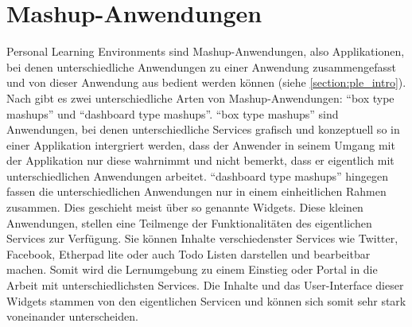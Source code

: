 \section{Mashup-Anwendungen}\label{section:mashup_anwendungen}
Personal Learning Environments sind Mashup-Anwendungen, also Applikationen, bei denen unterschiedliche Anwendungen zu einer Anwendung zusammengefasst und von dieser Anwendung aus bedient werden können (siehe \ref{section:ple_intro}). Nach \cite{Soylu2011} gibt es zwei unterschiedliche Arten von Mashup-Anwendungen: "`box type mashups"' und "`dashboard type mashups"'. "`box type mashups"' sind Anwendungen, bei denen unterschiedliche Services grafisch und konzeptuell so in einer Applikation intergriert werden, dass der Anwender in seinem Umgang mit der Applikation nur diese wahrnimmt und nicht bemerkt, dass er eigentlich mit unterschiedlichen Anwendungen arbeitet. "`dashboard type mashups"' hingegen fassen die unterschiedlichen Anwendungen nur in einem einheitlichen Rahmen zusammen. Dies geschieht meist über so genannte Widgets. Diese kleinen Anwendungen, stellen eine Teilmenge der Funktionalitäten des eigentlichen Services zur Verfügung. Sie können Inhalte verschiedenster Services wie Twitter, Facebook, Etherpad lite oder auch Todo Listen darstellen und bearbeitbar machen. Somit wird die Lernumgebung zu einem Einstieg oder Portal in die Arbeit mit unterschiedlichsten Services.  Die Inhalte und das User-Interface dieser Widgets stammen von den eigentlichen Servicen und können sich somit sehr stark voneinander unterscheiden. 

